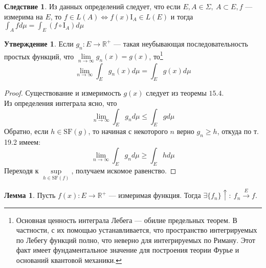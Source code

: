 \documentclass[11pt,a4paper]{report}
\def\Real{\mathbb{R}}
\theoremstyle{definition}
\theoremstyle{definition}
\newtheorem{lemma}{Лемма}[section]
\newtheorem{preposition}{Утверждение}[section]
\newtheorem{corollary}{Следствие}[section]
\theoremstyle{definition}
\begin{document}
		\begin{corollary}
			Из данных определений следует, что если $ E, A \in \Sigma,\ A \subset E, f $ — измерима на $ E $, то $ f \in L(A) \iff f(x) \mbox{I}_{A} \in L(E) $ и тогда $ \int_{A} f d\mu = \int_{E} (f \circ \mbox{I}_{A}) d\mu  $
		\end{corollary}
		\begin{preposition}
			Если $ g_{n}: E \to \Real^{+} $ — такая неубывающая последовательность простых функций, что $ \lim\limits_{n \to \infty} g_{n}(x) = g(x) $, то\footnote{Основная ценность интеграла Лебега — обилие предельных теорем. В частности, с их помощью устанавливается, что пространство интегрируемых по Лебегу функций полно, что неверно для интегрируемых по Риману. Этот факт имеет фундаментальное значение для построения теории Фурье и оснований квантовой механики.} 
			\[
				\lim\limits_{n\to\infty} \int_{E} g_{n}(x) d\mu = \int_{E} g(x) d\mu
			\]
		\end{preposition}
		\begin{proof}
			Существование и измеримость $ g(x) $ следует из теоремы $ 15.4 $.\\
			Из определения интеграла ясно, что 
			\[ \lim\limits_{n\to\infty} \int_{E} g_{n} d\mu \le \int_{E} g d\mu \]
			Обратно, если $ h \in \mbox{SF}(g) $, то начиная с некоторого $ n $ верно $ g_{n} \ge h $, откуда по т. 19.2 имеем: 
			\[ \lim\limits_{n\to\infty} \int_{E} g_{n} d\mu \ge \int_{E} h d\mu \]
			Переходя к $ \sup\limits_{h \in \mbox{SF}(f)} $, получаем искомое равенство.
		\end{proof}
		\begin{lemma}
			Пусть $ f(x): E \to \Real^{+} $ — измеримая функция. Тогда $ \exists \{f_{n}\}\uparrow:\ f_{n} \xrightarrow{E} f $.
		\end{lemma}
\end{document}
